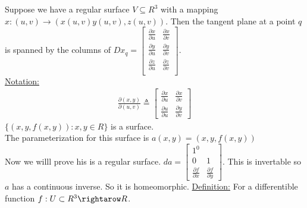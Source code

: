 \documentclass[12pt,letterpaper]{hmcpset}
\begin{document}
Suppose we have a regular surface $V \subseteq R^3$ with a mapping $x: (u, v) \rightarrow (x(u, v)
y(u, v), z(u, v))$. Then the tangent plane at a point $q$ is spanned by the
columns of $Dx_q = \begin{bmatrix}\frac{\partial x}{\partial u} & \frac{\partial x}{\partial v} \\
\frac{\partial y}{\partial u} & \frac{\partial y}{\partial v} \\
\frac{\partial z}{\partial u} & \frac{\partial z}{\partial v} \\
\end{bmatrix}$.  \\
\underline{Notation:}
\begin{align*}
  \frac{\partial(x, y)}{\partial(u, v)} \triangleq \begin{bmatrix}\frac{\partial x}{\partial u} & \frac{\partial x}{\partial v} \\
    \frac{\partial u}{\partial u} & \frac{\partial y}{\partial v}
  \end{bmatrix}
\end{align*}
$\{(x, y, f(x, y)) : x, y \in R \}$ is a surface.\\
The parameterization for this surface is $a(x, y) = (x, y, f(x, y))$ \\
Now we willl prove his is a regular surface. $da = \begin{bmatrix}1 ^ 0 \\ 0 &
  1 \\ \frac{\partial f}{\partial x} & \frac{\partial f}{\partial y}\end{bmatrix}$. This is invertable so
$a$ has a continuous inverse. So it is homeomorphic.
\underline{Definition:} For a differentible function $f: U \subset R^3 \rightarow R$. 
\end{document}
